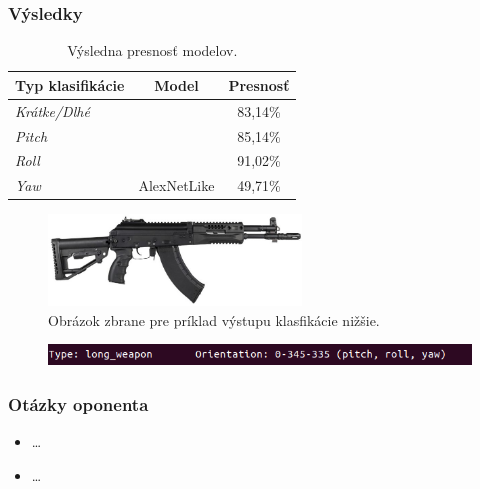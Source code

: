 \documentclass[10pt,xcolor=pdflatex]{beamer}
\begin{document}
\begin{frame}\frametitle{Výsledky}
    \begin{table}
        \begin{tabular}{ l | c | c }
            \textbf{Typ klasifikácie}   & \textbf{Model}                    & \textbf{Presnosť}   \\
            \hline
            \textit{Krátke/Dlhé}    &                                   & {83,14\%}           \\
            \textit{Pitch}          &                                   & {85,14\%}           \\
            \textit{Roll}           &                                   & {91,02\%}           \\
            \textit{Yaw}            & \multirow{-4}{*}{AlexNetLike}     & {49,71\%}
        \end{tabular}
        \caption{Výsledna presnosť modelov.}
    \end{table}

    \begin{figure}[H]
        \centering
        \includegraphics[width=0.6\textwidth]{img/prediction-weapon}
        \caption{Obrázok zbrane pre príklad výstupu klasfikácie nižšie.}
    \end{figure}

    \begin{figure}[H]
        \centering
        \includegraphics[width=1\textwidth]{img/result-prediction}
    \end{figure}

\end{frame}



\begin{frame}\frametitle{Otázky oponenta}
    \begin{itemize}
        \item \dots
        \item \dots
    \end{itemize}
\end{frame}
\end{document}
